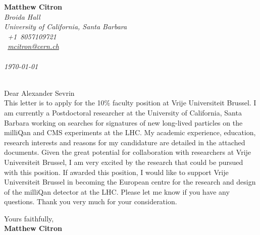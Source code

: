 \documentclass[12pt]{article}
\begin{document}
\sffamily   %
\hfill%
\begin{minipage}[t]{.6\textwidth}
\raggedleft%
{\bfseries Matthew Citron}\\[.35ex]
\small\itshape%
Broida Hall\\ University of California, Santa Barbara\\
\Telefon~+1~8057109721\\
\Letter~\href{mailto:mcitron@cern.ch}{mcitron@cern.ch}\\~\\

\today
\end{minipage}\\[1em]
%
\hfill %
Dear Alexander Sevrin\\[1.5em]
%
This letter is to apply for the 10\% faculty position at Vrije Universiteit Brussel. I am currently a Postdoctoral
researcher at the University of California, Santa Barbara working on searches for signatures of 
new long-lived particles on the milliQan and CMS experiments at the LHC.
My academic experience, education, research interests and reasons for my candidature are
detailed in the attached documents. Given the great potential for collaboration with 
researchers at Vrije Universiteit Brussel, I am very excited by the
research that could be pursued with this position. If awarded this position, I 
would like to support Vrije Universiteit Brussel in becoming the European centre for 
the research and design of the milliQan detector at the LHC. Please let me know if you have any questions. 
Thank you very much for your consideration.

Yours faithfully,\\[2em] %
%
{\bfseries Matthew Citron}\\
%
\vfill%
\end{document}
